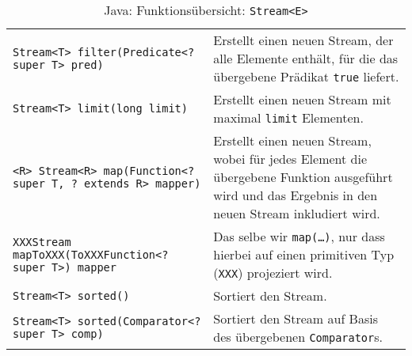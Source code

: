 \begin{sidewaystable}
\begin{tabular}{p{8cm} | p{13cm}}
		\texttt{Stream<T> filter(Predicate<? super T> pred)}                                             & Erstellt einen neuen Stream, der alle Elemente enthält, für die das übergebene Prädikat \texttt{true} liefert.                                                                                                \\
		\texttt{Stream<T> limit(long limit)}                                                             & Erstellt einen neuen Stream mit maximal \texttt{limit} Elementen.                                                                                                                                             \\
		\texttt{<R> Stream<R> map(Function<? super T, ? extends R> mapper)}                              & Erstellt einen neuen Stream, wobei für jedes Element die übergebene Funktion ausgeführt wird und das Ergebnis in den neuen Stream inkludiert wird.                                                            \\
		\texttt{XXXStream mapToXXX(ToXXXFunction<? super T>) mapper}                                     & Das selbe wir \texttt{map(\dots)}, nur dass hierbei auf einen primitiven Typ (\texttt{XXX}) projeziert wird.                                                                                                  \\
		\texttt{Stream<T> sorted()}                                                                      & Sortiert den Stream.                                                                                                                                                                                          \\
		\texttt{Stream<T> sorted(Comparator<? super T> comp)}                                            & Sortiert den Stream auf Basis des übergebenen \texttt{Comparator}s.                                                                                                                                           \\
	\end{tabular}
	\caption{Java: Funktionsübersicht: \texttt{Stream<E>}}
\end{sidewaystable}


